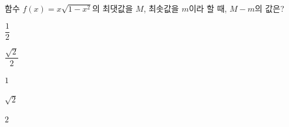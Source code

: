 함수 $f(x)=x\sqrt{1-x^2}$의 최댓값을 $M$, 최솟값을 $m$이라 할 때, $M-m$의 값은?
\begin{choices32}{\rule[-3ex]{0pt}{8ex}$\dfrac{1}{2}$}{\rule[-3ex]{0pt}{8ex}$\dfrac{\sqrt{2}}{2}$}{\rule[-3ex]{0pt}{8ex}$1$}{\rule[-3ex]{0pt}{8ex}$\sqrt{2}$}{\rule[-3ex]{0pt}{8ex}$2$}\end{choices32}

